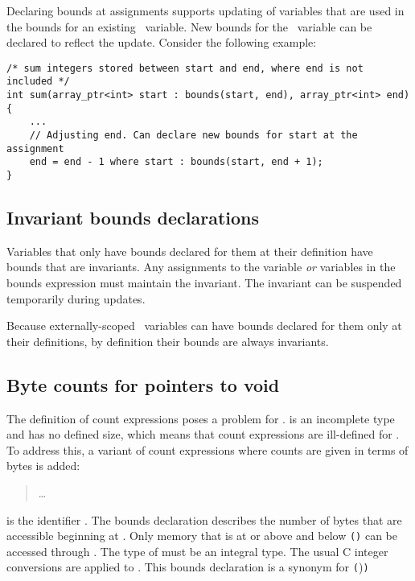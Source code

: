 Declaring bounds at assignments supports updating of variables that are
used in the bounds for an existing \arrayptr\ variable. New
bounds for the \arrayptr\ variable can be declared to reflect
the update. Consider the following example:

\begin{lstlisting}
/* sum integers stored between start and end, where end is not included */
int sum(array_ptr<int> start : bounds(start, end), array_ptr<int> end)
{ 
    ...
    // Adjusting end. Can declare new bounds for start at the assignment
    end = end - 1 where start : bounds(start, end + 1);
}
\end{lstlisting}


\subsection{Invariant bounds declarations}
\label{section:invariant-bounds-declarations}

Variables that only have bounds declared for them at their definition
have bounds that are invariants. Any assignments to the variable
\emph{or} variables in the bounds expression must maintain the
invariant. The invariant can be suspended temporarily during updates.

Because externally-scoped \arrayptr\ variables can have bounds declared
for them only at their definitions, by definition their bounds are
always invariants.

\subsection{Byte counts for pointers to void}
\label{section:pointers-to-void}

The definition of count expressions poses a problem for
\arrayptrvoid.  is an
incomplete type and has no defined size, which means that count
expressions are ill-defined for
\arrayptrvoid. To address this, a
variant of count expressions where counts are given in terms of bytes is
added:


\begin{quote}
\ldots{}

\end{quote}

 is the identifier .
The bounds declaration 
describes the number of bytes that are accessible beginning at . 
Only memory that is at or above  and below 
\lstinline|(|\arrayptrchar\lstinline|)|  \code{+}  can be accessed through 
. The type of  must be an integral type.  The usual C integer conversions are
applied to .  This bounds declaration is a synonym for 
           {
                      {\lstinline|(|\arrayptrchar)\lstinline|)|  \code{+} }
                      {}}

